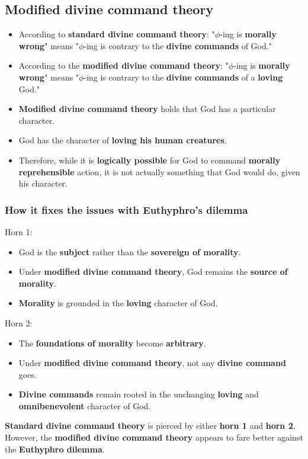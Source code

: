 \documentclass[11pt]{article}
\begin{document}
\subsection{Modified divine command theory}
\label{sec:orgadc72e6}
\begin{itemize}
\item According to \textbf{standard divine command theory}:
"\(\phi\)-ing is \textbf{morally wrong}" means "\(\phi\)-ing is contrary to the \textbf{divine commands} of God."
\item According to the \textbf{modified divine command theory}:
"\(\phi\)-ing is \textbf{morally wrong}" means "\(\phi\)-ing is contrary to the \textbf{divine commands} of a \textbf{loving} God."
\item \textbf{Modified divine command theory} holds that God has a particular character.
\item God has the character of \textbf{loving his human creatures}.
\item Therefore, while it is \textbf{logically possible} for God to command \textbf{morally reprehensible} action, it is not actually something that God would do, given his character.
\end{itemize}
\subsubsection{How it fixes the issues with Euthyphro's dilemma}
\label{sec:orgcf1b95f}
Horn 1:
\begin{itemize}
\item God is the \textbf{subject} rather than the \textbf{sovereign of morality}.
\item Under \textbf{modified divine command theory}, God remains the \textbf{source of morality}.
\item \textbf{Morality} is grounded in the \textbf{loving} character of God.
\end{itemize}

Horn 2:
\begin{itemize}
\item The \textbf{foundations of morality} become \textbf{arbitrary}.
\item Under \textbf{modified divine command theory}, not any \textbf{divine command} goes.
\item \textbf{Divine commands} remain rooted in the unchanging \textbf{loving} and \textbf{omnibenevolent} character of God.
\end{itemize}

\textbf{Standard divine command theory} is pierced by either \textbf{horn 1} and \textbf{horn 2}. However, the \textbf{modified divine command theory} appears to fare better against the \textbf{Euthyphro dilemma}.
\end{document}
